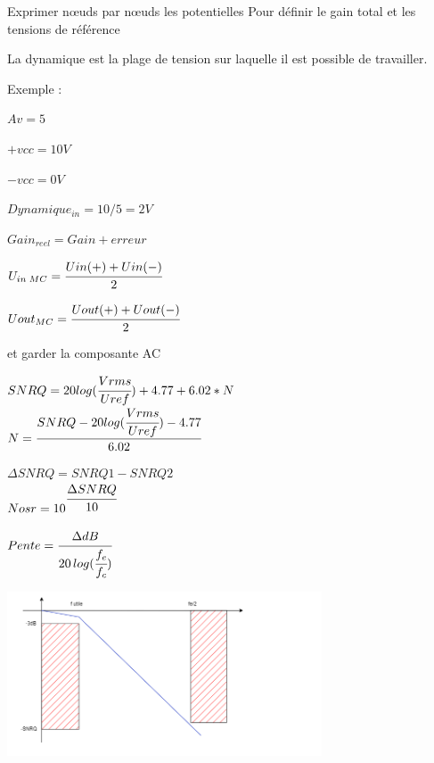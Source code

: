 \newpage

\hformbar


\hformbar


Exprimer nœuds par nœuds les potentielles 
Pour définir le gain total et les tensions de référence


La dynamique est la plage de tension sur laquelle il est possible de travailler.

Exemple :

$Av = 5 $

$+vcc = 10 V$

$-vcc = 0 V$

$ Dynamique_{in} = 10/5 = 2 V $ 


$Gain_{reel} = Gain + erreur$

$U_{in\;MC}  = \cfrac{Uin(+) + Uin(-)}{2}$

$Uout_{MC} = \cfrac{Uout(+) + Uout(-)}{2} $  

et garder la composante AC 

\hformbar


$SNRQ = 20log(\cfrac{Vrms}{Uref}) + 4.77 + 6.02 * N$\\

$N = \cfrac{SNRQ - 20log(\cfrac{Vrms}{Uref}) - 4.77}{6.02}$


$\Delta SNRQ = SNRQ1 - SNRQ2$\\

$Nosr = 10^{\cfrac{\Delta SNRQ}{10}}$\\




$Pente = \cfrac{\Delta dB}{20\,log(\cfrac{f_e}{f_c})}$

\includegraphics[width = 0.7\textwidth]{Test.drawio.png}


